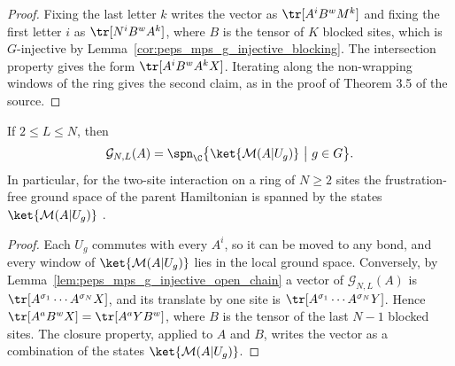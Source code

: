 \begin{proof}\leanok
    Fixing the last letter $k$ writes the vector as $\tr[A^iB^wM^k]$ and fixing
    the first letter $i$ as $\tr[N^iB^wA^k]$, where $B$ is the tensor of $K$
    blocked sites, which is $G$-injective by
    Lemma~\ref{cor:peps_mps_g_injective_blocking}. The intersection
    property gives the form $\tr[A^iB^wA^kX]$. Iterating along the
    non-wrapping windows of the ring gives the second claim, as in the proof of
    Theorem 3.5 of the source.
\end{proof}

\begin{lemma}%
    \label{thm:peps_mps_g_injective_parent_hamiltonian}
    \leanok
    If $2\le L\le N$, then
    \begin{align*}
        \mathcal G_{N,L}(A)=\spn_{\C}\bigl\{\ket{\mathcal M(A|U_g)}\ \big|\
        g\in G\bigr\}.
    \end{align*}
    In particular, for the two-site interaction on a ring of $N\ge2$ sites
    the frustration-free ground space of the parent Hamiltonian is spanned by
    the states $\ket{\mathcal M(A|U_g)}$
    \cite[Theorem~4.11]{Schuch2010PEPS}.
\end{lemma}

\begin{proof}\leanok
    Each $U_g$ commutes with every $A^i$, so it can be moved to any bond, and
    every window of $\ket{\mathcal M(A|U_g)}$ lies in the local ground space.
    Conversely, by Lemma~\ref{lem:peps_mps_g_injective_open_chain} a vector
    of $\mathcal G_{N,L}(A)$ is $\tr[A^{\sigma_1}\cdots A^{\sigma_N}X]$, and
    its translate by one site is $\tr[A^{\sigma_1}\cdots A^{\sigma_N}Y]$. Hence
    $\tr[A^aB^wX]=\tr[A^aYB^w]$, where $B$ is the tensor of the last $N-1$
    blocked sites. The closure property, applied to $A$ and $B$, writes the
    vector as a combination of the states $\ket{\mathcal M(A|U_g)}$.
\end{proof}

